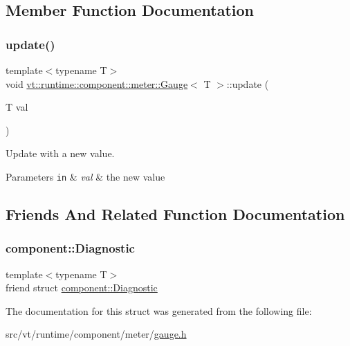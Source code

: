 \subsection{Member Function Documentation}
\mbox{\label{structvt_1_1runtime_1_1component_1_1meter_1_1_gauge_a60af475569c49b999e8fbc4c80a788ce}} 
\subsubsection{\texorpdfstring{update()}{update()}}
{\footnotesize\ttfamily template$<$typename T$>$ \\
void \hyperlink{structvt_1_1runtime_1_1component_1_1meter_1_1_gauge}{vt\+::runtime\+::component\+::meter\+::\+Gauge}$<$ T $>$\+::update (\begin{DoxyParamCaption}\item[{T}]{val }\end{DoxyParamCaption})\hspace{0.3cm}{\ttfamily [inline]}}



Update with a new value. 


\begin{DoxyParams}[1]{Parameters}
\mbox{\tt in}  & {\em val} & the new value \\
\hline
\end{DoxyParams}


\subsection{Friends And Related Function Documentation}
\mbox{\label{structvt_1_1runtime_1_1component_1_1meter_1_1_gauge_a48f263de9dbf26c1fc7736031cca9613}} 
\subsubsection{\texorpdfstring{component\+::\+Diagnostic}{component::Diagnostic}}
{\footnotesize\ttfamily template$<$typename T$>$ \\
friend struct \hyperlink{structvt_1_1runtime_1_1component_1_1_diagnostic}{component\+::\+Diagnostic}\hspace{0.3cm}{\ttfamily [friend]}}



The documentation for this struct was generated from the following file\+:\begin{DoxyCompactItemize}
\item 
src/vt/runtime/component/meter/\hyperlink{gauge_8h}{gauge.\+h}\end{DoxyCompactItemize}
